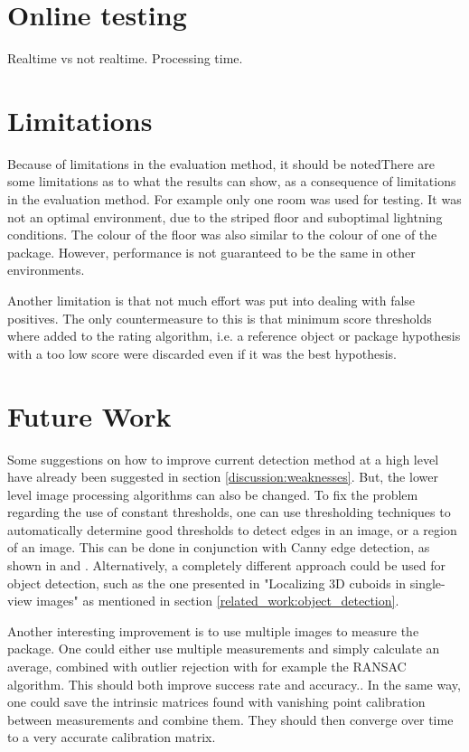\section{Online testing}
Realtime vs not realtime. Processing time. %

\section{Limitations}
Because of limitations in the evaluation method, it should be notedThere are some limitations as to what the results can show, as a consequence of limitations in the evaluation method.
For example only one room was used for testing.
It was not an optimal environment, due to the striped floor and suboptimal lightning conditions.
The colour of the floor was also similar to the colour of one of the package.
However, performance is not guaranteed to be the same in other environments.

Another limitation is that not much effort was put into dealing with false positives.
The only countermeasure to this is that minimum score thresholds where added to the rating algorithm, i.e. a reference object or package hypothesis with a too low score were discarded even if it was the best hypothesis.

\section{Future Work} \label{discussion:future_work}
Some suggestions on how to improve current detection method at a high level have already been suggested in section \ref{discussion:weaknesses}.
But, the lower level image processing algorithms can also be changed.
To fix the problem regarding the use of constant thresholds, one can use thresholding techniques to automatically determine good thresholds to detect edges in an image, or a region of an image.
This can be done in conjunction with Canny edge detection, as shown in \cite{wang2005fast} and \cite{liu2004automated}.
Alternatively, a completely different approach could be used for object detection, such as the one presented in "Localizing 3D cuboids in single-view images" as mentioned in section \ref{related_work:object_detection}.

Another interesting improvement is to use multiple images to measure the package.
One could either use multiple measurements and simply calculate an average, combined with outlier rejection with for example the RANSAC algorithm.
This should both improve success rate and accuracy..
In the same way, one could save the intrinsic matrices found with vanishing point calibration between measurements and combine them.
They should then converge over time to a very accurate calibration matrix. \cite{fischler1981random}

